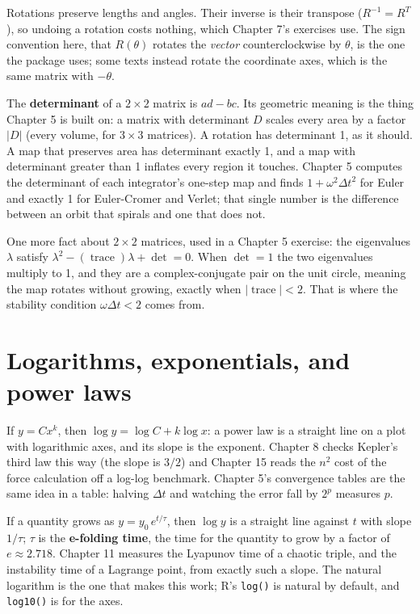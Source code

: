 \documentclass[
  10.5pt,
  letterpaper,
]{scrbook}
\theoremstyle{definition}
\theoremstyle{plain}
\theoremstyle{remark}
\begin{document}
Rotations preserve lengths and angles. Their inverse is their transpose
(\(R^{-1} = R^{T}\)), so undoing a rotation costs nothing, which Chapter
7's exercises use. The sign convention here, that \(R(\theta)\) rotates
the \emph{vector} counterclockwise by \(\theta\), is the one the package
uses; some texts instead rotate the coordinate axes, which is the same
matrix with \(-\theta\).

The \textbf{determinant} of a \(2\times2\) matrix is \(ad - bc\). Its
geometric meaning is the thing Chapter 5 is built on: a matrix with
determinant \(D\) scales every area by a factor \(|D|\) (every volume,
for \(3\times3\) matrices). A rotation has determinant 1, as it should.
A map that preserves area has determinant exactly 1, and a map with
determinant greater than 1 inflates every region it touches. Chapter 5
computes the determinant of each integrator's one-step map and finds
\(1 + \omega^2\Delta t^2\) for Euler and exactly 1 for Euler-Cromer and
Verlet; that single number is the difference between an orbit that
spirals and one that does not.

One more fact about \(2\times2\) matrices, used in a Chapter 5 exercise:
the eigenvalues \(\lambda\) satisfy
\(\lambda^2 - (\operatorname{trace})\lambda + \det = 0\). When
\(\det = 1\) the two eigenvalues multiply to 1, and they are a
complex-conjugate pair on the unit circle, meaning the map rotates
without growing, exactly when \(|\operatorname{trace}| < 2\). That is
where the stability condition \(\omega\Delta t < 2\) comes from.

\section{Logarithms, exponentials, and power
laws}\label{logarithms-exponentials-and-power-laws}

If \(y = C x^k\), then \(\log y = \log C + k\log x\): a power law is a
straight line on a plot with logarithmic axes, and its slope is the
exponent. Chapter 8 checks Kepler's third law this way (the slope is
\(3/2\)) and Chapter 15 reads the \(n^2\) cost of the force calculation
off a log-log benchmark. Chapter 5's convergence tables are the same
idea in a table: halving \(\Delta t\) and watching the error fall by
\(2^p\) measures \(p\).

If a quantity grows as \(y = y_0\,e^{t/\tau}\), then \(\log y\) is a
straight line against \(t\) with slope \(1/\tau\); \(\tau\) is the
\textbf{e-folding time}, the time for the quantity to grow by a factor
of \(e \approx 2.718\). Chapter 11 measures the Lyapunov time of a
chaotic triple, and the instability time of a Lagrange point, from
exactly such a slope. The natural logarithm is the one that makes this
work; R's \texttt{log()} is natural by default, and \texttt{log10()} is
for the axes.
\end{document}
